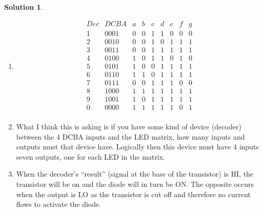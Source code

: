 \documentclass[10pt]{article}
\theoremstyle{definition}
\newtheorem{soln}{Solution}
\begin{document}
\begin{soln} ~
  \begin{enumerate}[label=(\alph*)]
    \item \begin{displaymath}
            \begin{array}{|c|c|c|c|c|c|c|c|c}
              Dec & DCBA & a & b & c & d & e & f & g \\ %
              \hline %
              1   & 0001 & 0 & 0 & 1 & 1 & 0 & 0 & 0 \\
              2   & 0010 & 0 & 0 & 1 & 0 & 1 & 1 & 1 \\
              3   & 0011 & 0 & 0 & 1 & 1 & 1 & 1 & 1 \\
              4   & 0100 & 1 & 0 & 1 & 1 & 0 & 1 & 0 \\
              5   & 0101 & 1 & 0 & 0 & 1 & 1 & 1 & 1 \\
              6   & 0110 & 1 & 1 & 0 & 1 & 1 & 1 & 1 \\
              7   & 0111 & 0 & 0 & 1 & 1 & 1 & 0 & 0 \\
              8   & 1000 & 1 & 1 & 1 & 1 & 1 & 1 & 1 \\
              9   & 1001 & 1 & 0 & 1 & 1 & 1 & 1 & 1 \\
              0   & 0000 & 1 & 1 & 1 & 1 & 1 & 0 & 1 \\
            \end{array}
          \end{displaymath}
    \item What I think this is asking is if you have some kind of device (decoder) between the 4 DCBA inputs and the LED matrix, how many inputs and outputs must that device have.
          Logically then this device must have 4 inputs seven outputs, one for each LED in the matrix.
    \item When the decoder's ``result'' (signal at the base of the transistor) is HI, the transistor will be on and the diode will in turn be ON. The opposite
          occurs when the output is LO as the transistor is cut off and therefore no current flows to activate the diode. 

\end{enumerate}
\end{soln}
\end{document}

